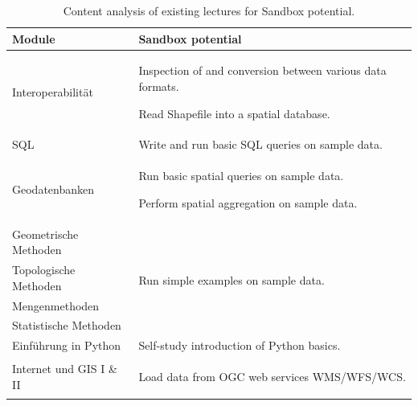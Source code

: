 \documentclass[11pt, a4paper, oneside, parskip=full-]{scrartcl}
\begin{document}
\begin{table}[!htbp]
  \centering
  \caption{Content analysis of existing lectures for Sandbox potential.}
  \label{tab:tContentAnalysis}
  \begin{tabularx}{\textwidth}{lX}
    \toprule
    \textbf{Module} & \textbf{Sandbox potential} \\
    \midrule
    Interoperabilität &
      \begin{itemize}[left=0pt,nosep,before={\begin{minipage}[t]{\hsize}},after
      ={\end{minipage}}]
      \item Inspection of and conversion between various data formats.
      \item Read Shapefile into a spatial database.
      \end{itemize}\nointerlineskip\\
    \midrule
    SQL & Write and run basic SQL queries on sample data. \\
    \midrule
    Geodatenbanken &
    \begin{itemize}[left=0pt,nosep,before={\begin{minipage}[t]{\hsize}},after
    ={\end{minipage}}]
      \item Run basic spatial queries on sample data.
      \item Perform spatial aggregation on sample data.
      \end{itemize}\nointerlineskip\\
    \midrule
    Geometrische Methoden & \multirow[t]{4}{*}{Run simple examples on sample
    data.} \\
    \cmidrule(r){1-1} Topologische Methoden &  \\
    \cmidrule(r){1-1} Mengenmethoden &  \\
    \cmidrule(r){1-1} Statistische Methoden &  \\
    \midrule
    Einführung in Python & Self-study introduction of Python basics. \\
    \midrule
    Internet und GIS I \& II &
      \begin{itemize}[left=0pt,nosep,before={\begin{minipage}[t]{\hsize}},after
      ={\end{minipage}}]
      \item Load data from OGC web services WMS/WFS/WCS.

\end{itemize}
\end{tabularx}
\end{table}
\end{document}
